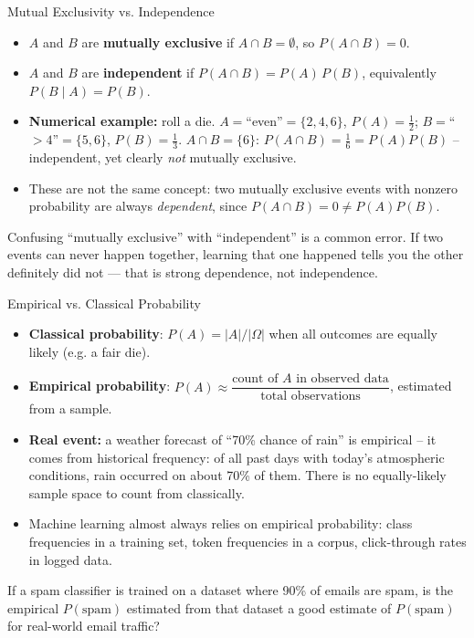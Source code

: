 \begin{frame}{Mutual Exclusivity vs. Independence}
\begin{itemize}
  \item $A$ and $B$ are \textbf{mutually exclusive} if $A \cap B = \emptyset$, so $P(A \cap B) = 0$.
  \pause
  \item $A$ and $B$ are \textbf{independent} if $P(A \cap B) = P(A)\,P(B)$, equivalently $P(B \mid A) = P(B)$.
  \pause
  \item \textbf{Numerical example:} roll a die. $A=$``even''$=\{2,4,6\}$, $P(A)=\tfrac12$; $B=$``$>4$''$=\{5,6\}$, $P(B)=\tfrac13$. $A\cap B=\{6\}$: $P(A\cap B)=\tfrac16=P(A)P(B)$ -- independent, yet clearly \emph{not} mutually exclusive.
  \pause
  \item These are not the same concept: two mutually exclusive events with nonzero probability are always \emph{dependent}, since $P(A\cap B) = 0 \neq P(A)P(B)$.
\end{itemize}
\pause
\begin{rlpitfall}
Confusing ``mutually exclusive'' with ``independent'' is a common error. If two events can never happen together, learning that one happened tells you the other definitely did not --- that is strong dependence, not independence.
\end{rlpitfall}
\end{frame}

\begin{frame}{Empirical vs. Classical Probability}
\begin{itemize}
  \item \textbf{Classical probability}: $P(A) = |A| / |\Omega|$ when all outcomes are equally likely (e.g. a fair die).
  \pause
  \item \textbf{Empirical probability}: $P(A) \approx \dfrac{\text{count of } A \text{ in observed data}}{\text{total observations}}$, estimated from a sample.
  \pause
  \item \textbf{Real event:} a weather forecast of ``70\% chance of rain'' is empirical -- it comes from historical frequency: of all past days with today's atmospheric conditions, rain occurred on about 70\% of them. There is no equally-likely sample space to count from classically.
  \pause
  \item Machine learning almost always relies on empirical probability: class frequencies in a training set, token frequencies in a corpus, click-through rates in logged data.
\end{itemize}
\pause
\begin{rlquestion}
If a spam classifier is trained on a dataset where 90\% of emails are spam, is the empirical $P(\text{spam})$ estimated from that dataset a good estimate of $P(\text{spam})$ for real-world email traffic?
\end{rlquestion}
\end{frame}

